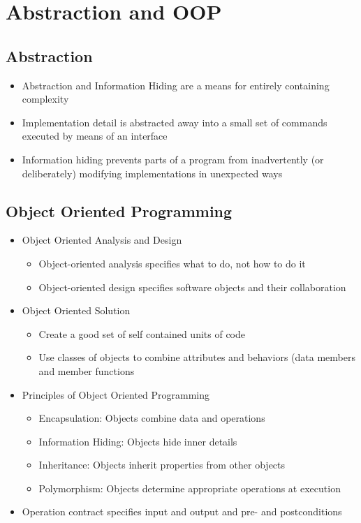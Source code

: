 \documentclass{article}
\begin{document}
\section{Abstraction and OOP}
\subsection{Abstraction}
\begin{itemize}
    \item Abstraction and Information Hiding are a means for entirely containing complexity
    \item Implementation detail is abstracted away into a small set of commands executed by means of an interface
    \item Information hiding prevents parts of a program from inadvertently (or deliberately) modifying implementations in unexpected ways
\end{itemize}
\subsection{Object Oriented Programming}
\begin{itemize}
    \item Object Oriented Analysis and Design
    \begin{itemize}
        \item Object-oriented analysis specifies what to do, not how to do it
        \item Object-oriented design specifies software objects and their collaboration
    \end{itemize}
    \item Object Oriented Solution
    \begin{itemize}
        \item Create a good set of self contained units of code
        \item Use classes of objects to combine attributes and behaviors (data members and member functions 
    \end{itemize}
    \item Principles of Object Oriented Programming 
    \begin{itemize}
        \item Encapsulation: Objects combine data and operations
        \item Information Hiding: Objects hide inner details
        \item Inheritance: Objects inherit properties from other objects
        \item Polymorphism: Objects determine appropriate operations at execution
    \end{itemize}
    \item Operation contract specifies input and output and pre- and postconditions
\end{itemize}
\end{document}
